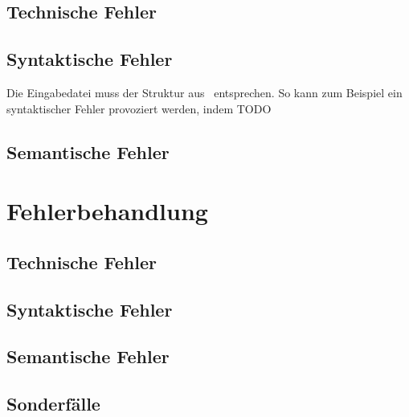 \subsection{Technische Fehler}\label{subsec:technische-fehler}

\subsection{Syntaktische Fehler}\label{subsec:syntaktische-fehler}
Die Eingabedatei muss der Struktur aus~ entsprechen.
So kann zum Beispiel ein syntaktischer Fehler provoziert werden, indem TODO%

\subsection{Semantische Fehler}\label{subsec:semantische-fehler}


\section{Fehlerbehandlung}\label{sec:fehlerbehandlung}

\subsection{Technische Fehler}\label{subsec:technische-fehler-behandlung}

\subsection{Syntaktische Fehler}\label{subsec:syntaktische-fehler-behandlung}

\subsection{Semantische Fehler}\label{subsec:semantische-fehler-behandlung}

\subsection{Sonderfälle}\label{subsec:sonderfaelle}
